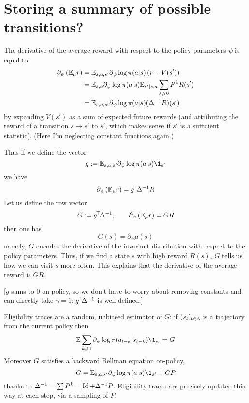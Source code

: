 \documentclass[11pt,a4paper]{article}
\begin{document}
\section{Storing a summary of possible transitions?}

The derivative of the average reward with respect to the policy
parameters $\psi$ is equal to
\begin{align}
\partial_\psi \left(\mathbb{E}_\mu r\right)&=
\mathbb{E}_{s,a,s'} \partial_\psi \log \pi(a|s)\left(
r+V(s')
\right)
\\&=\mathbb{E}_{s,a}\partial_\psi \log \pi(a|s)\mathbb{E}_{s'|s,a}\sum_{k\geqslant 0}P^k R(s')
\\&=\mathbb{E}_{s,a,s'}\partial_\psi \log \pi(a|s)(\Delta^{-1}R)(s')
\end{align}
by expanding $V(s')$ as a sum of expected future rewards (and attributing
the reward of a transition $s\to s'$ to $s'$, which makes sense if $s'$
is a sufficient statistic).
(Here I'm neglecting constant functions again.)

Thus if we define the vector
\begin{equation}
g\deq \E_{s,a,s'}\partial_\psi \log \pi(a|s)\1_{s'}
\end{equation}
we have
\begin{equation}
\partial_\psi \left(\mathbb{E}_\mu r\right)=g^{\!\top}\!\Delta^{-1}R
\end{equation}
Let us define the row vector
\begin{equation}
G\mathrel{\mathop{:}}= g^{\!\top}\!\Delta^{-1},\qquad \partial_\psi \left(\mathbb{E}_\mu
r\right)=GR
\end{equation}
then one has
\begin{equation}
G(s)=\partial_\psi \mu(s)
\end{equation}
namely, $G$ encodes the derivative of the invariant distribution with
respect to the policy parameters. Thus, if we find a state $s$ with high
reward $R(s)$, $G$ tells us how we can visit $s$ more often. This
explains that the derivative of the average reward is $GR$.

[$g$ sums to $0$ on-policy, so we don't have to worry about removing
constants and can directly take $\gamma=1$: $g^{\!\top}\!\Delta^{-1}$ is
well-defined.]

Eligibility traces are a random, unbiased estimator of $G$: if
$(s_t)_{t\in {\mathbb{Z}}}$ is a
trajectory from the current policy then
\begin{equation}
\E\sum_{k\geq 1}\partial_\psi \log \pi(a_{t-k}|s_{t-k})\1_{s_t}=G
\end{equation}
Moreover $G$ satisfies a backward Bellman equation on-policy,
\begin{equation}
G=\E_{s,a,s'} \partial_\psi \log \pi(a|s)\1_{s'}+GP
\end{equation}
thanks to $\Delta^{-1}=\sum P^k=\operatorname{Id}+\Delta^{-1}P$. Eligibility traces are
precisely
updated this way at each step, via a sampling of $P$.
\end{document}
